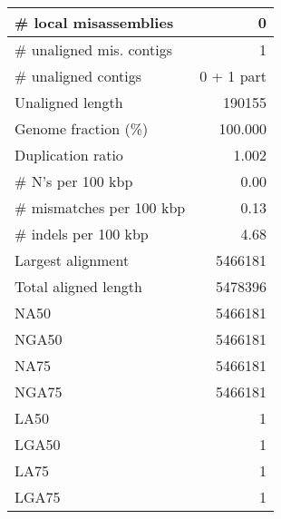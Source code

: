 \documentclass[12pt,a4paper]{article}
\begin{document}
\begin{table}[ht]
\begin{center}
\begin{tabular}{|l*{1}{|r}|}
\# local misassemblies & 0 \\ \hline
\# unaligned mis. contigs & 1 \\ \hline
\# unaligned contigs & 0 + 1 part \\ \hline
Unaligned length & 190155 \\ \hline
Genome fraction (\%) & 100.000 \\ \hline
Duplication ratio & 1.002 \\ \hline
\# N's per 100 kbp & 0.00 \\ \hline
\# mismatches per 100 kbp & 0.13 \\ \hline
\# indels per 100 kbp & 4.68 \\ \hline
Largest alignment & 5466181 \\ \hline
Total aligned length & 5478396 \\ \hline
NA50 & 5466181 \\ \hline
NGA50 & 5466181 \\ \hline
NA75 & 5466181 \\ \hline
NGA75 & 5466181 \\ \hline
LA50 & 1 \\ \hline
LGA50 & 1 \\ \hline
LA75 & 1 \\ \hline
LGA75 & 1 \\ \hline
\end{tabular}
\end{center}
\end{table}
\end{document}
